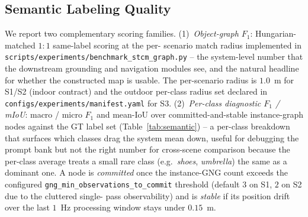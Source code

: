 \subsection{Semantic Labeling Quality}
\label{sec:semantic}

We report two complementary scoring families. (1)~\emph{Object-graph
$F_1$}: Hungarian-matched $1{:}1$ same-label scoring at the per-
scenario match radius implemented in
\texttt{scripts/experiments/benchmark\_stcm\_graph.py} -- the
system-level number that the downstream grounding and navigation
modules see, and the natural headline for whether the constructed
map is usable. The per-scenario radius is $1.0$~m for S1/S2 (indoor
contract) and the outdoor per-class radius set declared in
\texttt{configs/experiments/manifest.yaml} for S3.
(2)~\emph{Per-class diagnostic $F_1$ / mIoU}: macro / micro
$F_1$ and mean-IoU over committed-and-stable instance-graph nodes
against the GT label set (Table~\ref{tab:semantic}) -- a per-class
breakdown that surfaces which classes drag the system mean down,
useful for debugging the prompt bank but not the right number for
cross-scene comparison because the per-class average treats a small
rare class (e.g.\ \emph{shoes}, \emph{umbrella}) the same as a
dominant one. A node is \emph{committed} once the instance-GNG count
exceeds the configured \texttt{gng\_min\_observations\_to\_commit}
threshold (default $3$ on S1, $2$ on S2 due to the cluttered single-
pass observability) and is \emph{stable} if its position drift over
the last $1$~Hz processing window stays under $0.15$~m.

